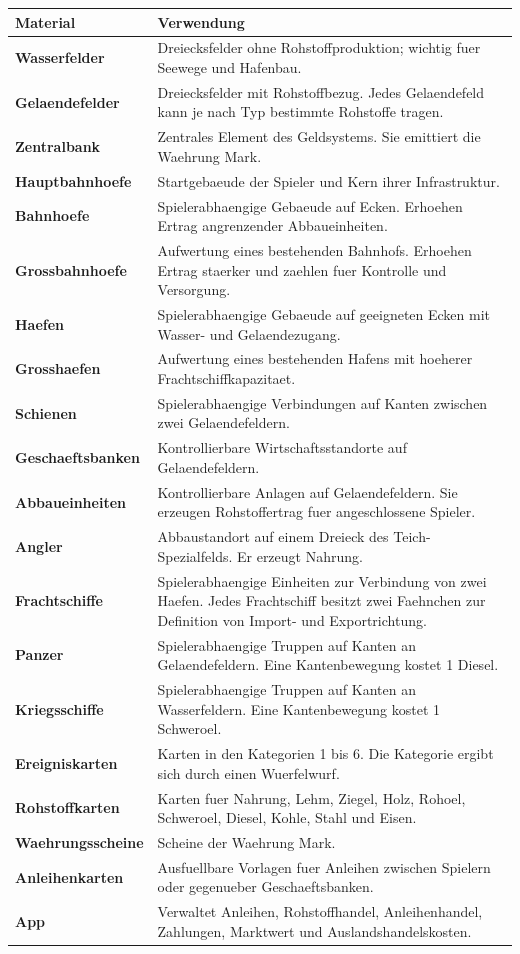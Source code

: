 \documentclass[11pt,a4paper,oneside,parskip=half]{scrreprt}
\begin{document}
\begin{longtable}{>{\bfseries}p{}p{}}
\toprule
Material & Verwendung \\
\midrule
Wasserfelder & Dreiecksfelder ohne Rohstoffproduktion; wichtig fuer Seewege und Hafenbau. \\
Gelaendefelder & Dreiecksfelder mit Rohstoffbezug. Jedes Gelaendefeld kann je nach Typ bestimmte Rohstoffe tragen. \\
Zentralbank & Zentrales Element des Geldsystems. Sie emittiert die Waehrung Mark. \\
Hauptbahnhoefe & Startgebaeude der Spieler und Kern ihrer Infrastruktur. \\
Bahnhoefe & Spielerabhaengige Gebaeude auf Ecken. Erhoehen Ertrag angrenzender Abbaueinheiten. \\
Grossbahnhoefe & Aufwertung eines bestehenden Bahnhofs. Erhoehen Ertrag staerker und zaehlen fuer Kontrolle und Versorgung. \\
Haefen & Spielerabhaengige Gebaeude auf geeigneten Ecken mit Wasser- und Gelaendezugang. \\
Grosshaefen & Aufwertung eines bestehenden Hafens mit hoeherer Frachtschiffkapazitaet. \\
Schienen & Spielerabhaengige Verbindungen auf Kanten zwischen zwei Gelaendefeldern. \\
Geschaeftsbanken & Kontrollierbare Wirtschaftsstandorte auf Gelaendefeldern. \\
Abbaueinheiten & Kontrollierbare Anlagen auf Gelaendefeldern. Sie erzeugen Rohstoffertrag fuer angeschlossene Spieler. \\
Angler & Abbaustandort auf einem Dreieck des Teich-Spezialfelds. Er erzeugt Nahrung. \\
Frachtschiffe & Spielerabhaengige Einheiten zur Verbindung von zwei Haefen. Jedes Frachtschiff besitzt zwei Faehnchen zur Definition von Import- und Exportrichtung. \\
Panzer & Spielerabhaengige Truppen auf Kanten an Gelaendefeldern. Eine Kantenbewegung kostet 1 Diesel. \\
Kriegsschiffe & Spielerabhaengige Truppen auf Kanten an Wasserfeldern. Eine Kantenbewegung kostet 1 Schweroel. \\
Ereigniskarten & Karten in den Kategorien 1 bis 6. Die Kategorie ergibt sich durch einen Wuerfelwurf. \\
Rohstoffkarten & Karten fuer Nahrung, Lehm, Ziegel, Holz, Rohoel, Schweroel, Diesel, Kohle, Stahl und Eisen. \\
Waehrungsscheine & Scheine der Waehrung Mark. \\
Anleihenkarten & Ausfuellbare Vorlagen fuer Anleihen zwischen Spielern oder gegenueber Geschaeftsbanken. \\
App & Verwaltet Anleihen, Rohstoffhandel, Anleihenhandel, Zahlungen, Marktwert und Auslandshandelskosten. \\
\bottomrule
\end{longtable}
\end{document}
